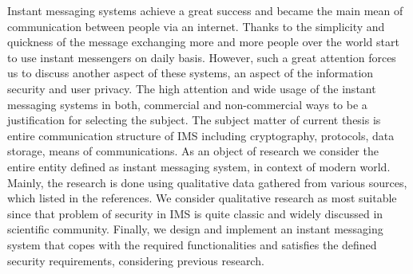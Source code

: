
Instant messaging systems achieve a great success and became the main mean of communication
between people via an internet.
Thanks to the simplicity and quickness of the message exchanging more and more people over the world start to use
instant messengers on daily basis.
However, such a great attention forces us to discuss another aspect of these systems, an aspect of the
information security and user privacy.
The high attention and wide usage of the instant messaging systems in both, commercial and non-commercial ways to be
a justification for selecting the subject.
The subject matter of current thesis is entire communication structure of IMS including cryptography, protocols,
data storage, means of communications.
As an object of research we consider the entire entity defined as instant messaging system, in context of modern world.
Mainly, the research is done using qualitative data gathered from various sources, which listed in the references.
We consider qualitative research as most suitable since that problem of security in IMS is quite classic and widely
discussed in scientific community.
Finally, we design and implement an instant messaging system that copes with the required functionalities and satisfies
the defined security requirements, considering previous research.